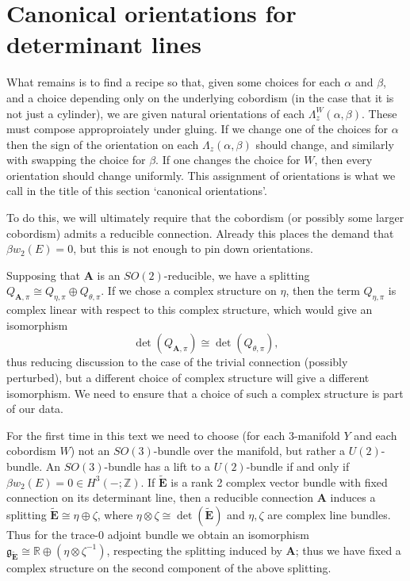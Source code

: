 \documentclass[10pt,a4paper]{amsart}
\theoremstyle{definition}
\theoremstyle{remark}
\numberwithin{figure}{qchap}
\begin{document}
\section{Canonical orientations for determinant lines}\label{sec:or-canonical}
What remains is to find a recipe so that, given some choices for each $\alpha$ and $\beta$, and a choice depending only on the underlying cobordism (in the case that it is not just a cylinder), we are given natural orientations of each $\Lambda^W_z(\alpha, \beta)$. These must compose approproiately under gluing. If we change one of the choices for $\alpha$ then the sign of the orientation on each $\Lambda_z(\alpha, \beta)$ should change, and similarly with swapping the choice for $\beta$. If one changes the choice for $W$, then every orientation should change uniformly. This assignment of orientations is what we call in the title of this section `canonical orientations'.

To do this, we will ultimately require that the cobordism (or possibly some larger cobordism) admits a reducible connection. Already this places the demand that $\beta w_2(E) = 0$, but this is not enough to pin down orientations.

Supposing that $\mathbf{A}$ is an $SO(2)$-reducible, we have a splitting $Q_{\mathbf{A},\pi} \cong Q_{\eta, \pi} \oplus Q_{\theta, \pi}$. If we chose a complex structure on $\eta$, then the term $Q_{\eta, \pi}$ is complex linear with respect to this complex structure, which would give an isomorphism 
$$\det(Q_{\mathbf{A},\pi}) \cong \det(Q_{\theta, \pi}),$$ 
thus reducing discussion to the case of the trivial connection (possibly perturbed), but a different choice of complex structure will give a different isomorphism. We need to ensure that a choice of such a complex structure is part of our data.

For the first time in this text we need to choose (for each 3-manifold $Y$ and each cobordism $W$) not an $SO(3)$-bundle over the manifold, but rather a $U(2)$-bundle. An $SO(3)$-bundle has a lift to a $U(2)$-bundle if and only if $\beta w_2(E) = 0 \in H^3(-;\mathbb Z)$. If $\widetilde{\mathbf{E}}$ is a rank 2 complex vector bundle with fixed connection on its determinant line, then a reducible connection $\mathbf{A}$ induces a splitting $\widetilde{\mathbf{E}} \cong \eta \oplus \zeta$, where $\eta \otimes \zeta \cong \det(\widetilde{\mathbf{E}})$ and $\eta, \zeta$ are complex line bundles. Thus for the trace-$0$ adjoint bundle we obtain an isomorphism $\mathfrak g_{\widetilde{\mathbf{E}}} \cong \mathbb R \oplus (\eta \otimes \zeta^{-1})$, respecting the splitting induced by $\mathbf{A}$; thus we have fixed a complex structure on the second component of the above splitting.
\end{document}
